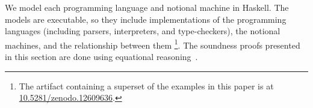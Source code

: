 We model each programming language and notional machine in Haskell.
The models are executable,
so they include implementations of the programming languages
(including parsers, interpreters, and type-checkers),
the notional machines,
and the relationship between them%
\footnote{%
The artifact containing a superset of the examples in this paper
is at
\href{https://zenodo.org/doi/10.5281/zenodo.12609636}{10.5281/zenodo.12609636}.
}.
The soundness proofs presented in this section are done using equational reasoning~\citep{gibbonsCalculatingFunctionalPrograms2002,birdAlgebraicIdentitiesProgram1989}.













